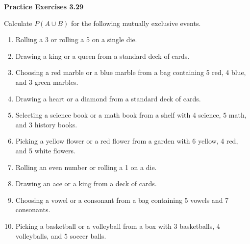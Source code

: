 \vspace{0.3ex}
\noindent\textbf{Practice Exercises 3.29}

\vspace{0.2ex}

Calculate \( P(A \cup B) \) for the following mutually exclusive events.

\begin{enumerate}[label=\color{blue}\arabic*.]
    \item Rolling a 3 or rolling a 5 on a single die.
    \item Drawing a king or a queen from a standard deck of cards.
    \item Choosing a red marble or a blue marble from a bag containing 5 red, 4 blue, and 3 green marbles.
    \item Drawing a heart or a diamond from a standard deck of cards.
    \item Selecting a science book or a math book from a shelf with 4 science, 5 math, and 3 history books.
    \item Picking a yellow flower or a red flower from a garden with 6 yellow, 4 red, and 5 white flowers.
    \item Rolling an even number or rolling a 1 on a die.
    \item Drawing an ace or a king from a deck of cards.
    \item Choosing a vowel or a consonant from a bag containing 5 vowels and 7 consonants.
    \item Picking a basketball or a volleyball from a box with 3 basketballs, 4 volleyballs, and 5 soccer balls.
\end{enumerate}
